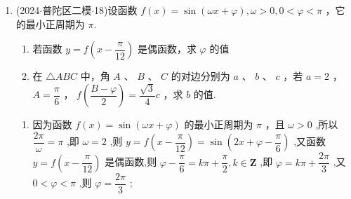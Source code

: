 \begin{enumerate}
\begin{jieda}
\begin{enumerate}
            \item 由题, $g\left( x\right)  = \sqrt{3}\sin x\sin \left( {x + \dfrac{\pi }{2}}\right)  - \sin x\sin \left( {x + \pi }\right)  =  \sqrt{3}\sin x\cos x + {\sin }^{2}x = \dfrac{\sqrt{3}}{2}\sin {2x} + \dfrac{1 - \cos {2x}}{2} = \sin \left( {{2x} - \dfrac{\pi }{6}}\right)  +  \dfrac{1}{2}$ ,故 $g\left( x\right)  - m = \dfrac{1}{2}$ 在 $x \in  \left\lbrack  {0,\dfrac{\pi }{2}}\right\rbrack$ 时有解,等价于 $m =  \sin \left( {{2x} - \dfrac{\pi }{6}}\right)$ 在 $x \in  \left\lbrack  {0,\dfrac{\pi }{2}}\right\rbrack$ 时有解. 可知 ${2x} - \dfrac{\pi }{6} \in  \left\lbrack  {-\dfrac{\pi }{6}}\right.$ , $\left. \dfrac{5\pi }{6}\right\rbrack$ ,因而 $\sin \left( {{2x} - \dfrac{\pi }{6}}\right)  \in  \left\lbrack  {-\dfrac{1}{2},1}\right\rbrack$ ,所以实数 $m$ 的取值范围是 $\left\lbrack  {-\dfrac{1}{2},1}\right\rbrack$.
        \end{enumerate}
    \end{jieda}
    \item (2024$\cdot$普陀区二模$\cdot$18)设函数 $f\left( x\right)  = \sin \left( {{\omega x} + \varphi }\right) ,\omega  > 0,0 < \varphi  < \pi$ ，它的最小正周期为 $\pi$.
    \begin{enumerate}
        \item 若函数 $y = f\left( {x - \dfrac{\pi }{12}}\right)$ 是偶函数，求 $\varphi$ 的值
        \item 在 $\bigtriangleup  {ABC}$ 中，角 $A$ 、 $B$ 、 $C$ 的对边分别为 $a$ 、 $b$ 、 $c$ ，若 $a = 2$ ， $A = \dfrac{\pi }{6}$ ， $f\left( \dfrac{B - \varphi }{2}\right)  = \dfrac{\sqrt{3}}{4}c$ ，求 $b$ 的值.
    \end{enumerate}
    \begin{jieda}
        \begin{enumerate}
            \item 因为函数 $f\left( x\right)  = \sin \left( {{\omega x} + \varphi }\right)$ 的最小正周期为 $\pi$ ，且 $\omega  > 0$ ,所以 $\dfrac{2\pi }{\omega } = \pi$ ,即 $\omega  = 2$ ,则 $y = f\left( {x - \dfrac{\pi }{12}}\right)  = \sin \left({2x} + {\varphi  - \dfrac{\pi }{6}}\right)$ ,又函数 $y = f\left( {x - \dfrac{\pi }{12}}\right)$ 是偶函数,则 $\varphi  - \dfrac{\pi }{6} = {k\pi } +  \dfrac{\pi }{2},k \in  \mathbf{Z}$ ,即 $\varphi  = {k\pi } + \dfrac{2\pi }{3}$ ,又 $0 < \varphi  < \pi$ ,则 $\varphi  = \dfrac{2\pi }{3}$ ;
            

\end{enumerate}
\end{jieda}
\end{enumerate}
